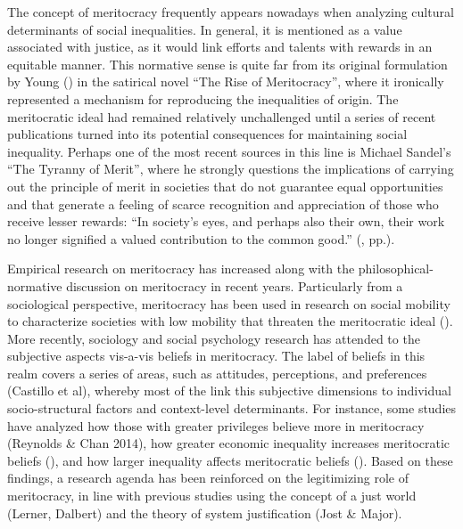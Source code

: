 \documentclass[
  letterpaper,
  DIV=11,
  numbers=noendperiod]{scrartcl}
\begin{document}
The concept of meritocracy frequently appears nowadays when analyzing
cultural determinants of social inequalities. In general, it is
mentioned as a value associated with justice, as it would link efforts
and talents with rewards in an equitable manner. This normative sense is
quite far from its original formulation by Young
() in the satirical novel ``The Rise
of Meritocracy'', where it ironically represented a mechanism for
reproducing the inequalities of origin. The meritocratic ideal had
remained relatively unchallenged until a series of recent publications
turned into its potential consequences for maintaining social
inequality. Perhaps one of the most recent sources in this line is
Michael Sandel's ``The Tyranny of Merit'', where he strongly questions
the implications of carrying out the principle of merit in societies
that do not guarantee equal opportunities and that generate a feeling of
scarce recognition and appreciation of those who receive lesser rewards:
``In society's eyes, and perhaps also their own, their work no longer
signified a valued contribution to the common good.''
(, pp.).

Empirical research on meritocracy has increased along with the
philosophical-normative discussion on meritocracy in recent years.
Particularly from a sociological perspective, meritocracy has been used
in research on social mobility to characterize societies with low
mobility that threaten the meritocratic ideal
(). More recently,
sociology and social psychology research has attended to the subjective
aspects vis-a-vis beliefs in meritocracy. The label of beliefs in this
realm covers a series of areas, such as attitudes, perceptions, and
preferences (Castillo et al), whereby most of the link this subjective
dimensions to individual socio-structural factors and context-level
determinants. For instance, some studies have analyzed how those with
greater privileges believe more in meritocracy (Reynolds \& Chan 2014),
how greater economic inequality increases meritocratic beliefs
(), and how larger inequality
affects meritocratic beliefs
(). Based on
these findings, a research agenda has been reinforced on the
legitimizing role of meritocracy, in line with previous studies using
the concept of a just world (Lerner, Dalbert) and the theory of system
justification (Jost \& Major).
\end{document}
